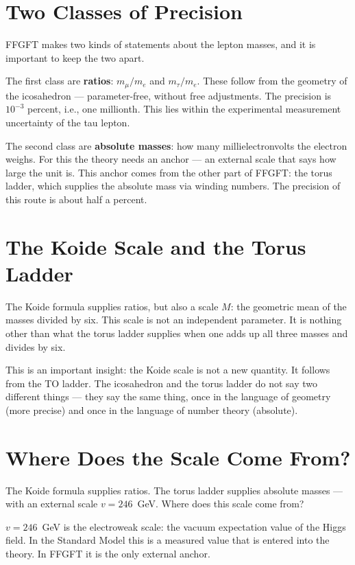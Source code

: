 \documentclass[12pt,oneside]{book}
\begin{document}
\section{Two Classes of Precision}

FFGFT makes two kinds of statements about the lepton masses, and it is important to keep the two apart.

The first class are \textbf{ratios}: $m_\mu/m_e$ and $m_\tau/m_e$. These follow from the geometry of the icosa\-hedron --- parameter-free, without free adjustments. The precision is $10^{-3}$ percent, i.e., one millionth. This lies within the experimental measurement uncertainty of the tau lepton.

The second class are \textbf{absolute masses}: how many millielectronvolts the electron weighs. For this the theory needs an anchor --- an external scale that says how large the unit is. This anchor comes from the other part of FFGFT: the torus ladder, which supplies the absolute mass via winding numbers. The precision of this route is about half a percent.

\section{The Koide Scale and the Torus Ladder}

The Koide formula supplies ratios, but also a scale $M$: the geometric mean of the masses divided by six. This scale is not an independent parameter. It is nothing other than what the torus ladder supplies when one adds up all three masses and divides by six.

This is an important insight: the Koide scale is not a new quantity. It follows from the TO ladder. The icosa\-hedron and the torus ladder do not say two different things --- they say the same thing, once in the language of geometry (more precise) and once in the language of number theory (absolute).

\section{Where Does the Scale Come From?}

The Koide formula supplies ratios. The torus ladder supplies absolute masses --- with an external scale $v = 246$~GeV. Where does this scale come from?

$v = 246$~GeV is the electro\-weak scale: the vacuum expectation value of the Higgs field. In the Standard Model this is a measured value that is entered into the theory. In FFGFT it is the only external anchor.
\end{document}
